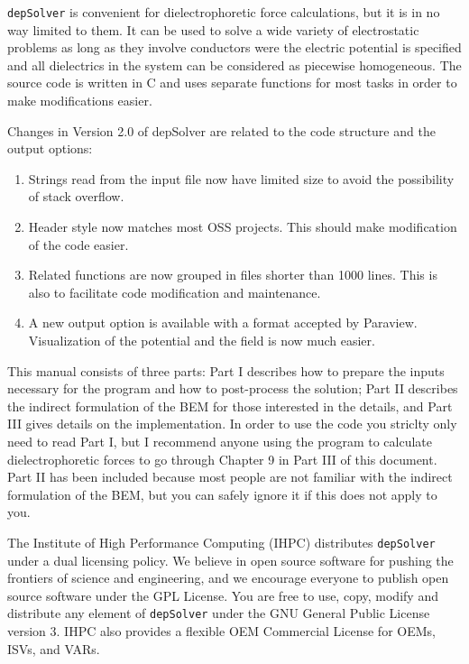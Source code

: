 \documentclass[12pt]{report}
\begin{document}
\noindent \verb+depSolver+ is convenient for dielectrophoretic force calculations, but it is in no way limited to them. It can be used to solve a wide variety of electrostatic problems as long as they involve conductors were the electric potential is specified and all dielectrics in the system can be considered as piecewise homogeneous. The source code is written in C and uses separate functions for most tasks in order to make modifications easier.

\noindent Changes in Version 2.0 of depSolver are related to the code structure and the output options:

\begin{enumerate}
\item Strings read from the input file now have limited size to avoid the possibility of stack overflow.
\item Header style now matches most OSS projects. This should make modification of the code easier.
\item Related functions are now grouped in files shorter than 1000 lines. This is also to facilitate code modification and maintenance.
\item A new output option is available with a format accepted by Paraview\cite{Paraview}. Visualization of the potential and the field is now much easier.
\end{enumerate}

\noindent This manual consists of three parts: Part I describes how to prepare the inputs necessary for the program and how to post-process the solution; Part II describes the indirect formulation of the BEM for those interested in the details, and Part III gives details on the implementation. In order to use the code you striclty only need to read Part I, but I recommend anyone using the program to calculate dielectrophoretic forces to go through Chapter 9 in Part III of this document. Part II has been included because most people are not familiar with the indirect formulation of the BEM, but you can safely ignore it if this does not apply to you.

\noindent The Institute of High Performance Computing (IHPC) distributes \verb+depSolver+ under a dual licensing policy. We believe in open source software for pushing the frontiers of science and engineering, and we encourage everyone to publish open source software under the GPL License. You are free to use, copy, modify and distribute any element of \verb+depSolver+ under the GNU General Public License version 3. IHPC also provides a flexible OEM Commercial License for OEMs, ISVs, and VARs.
\end{document}
